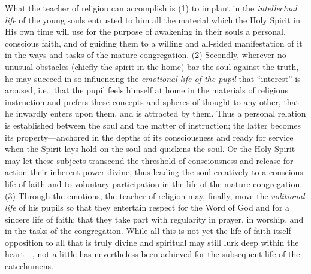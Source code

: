 What the teacher of religion can accomplish is (1) to implant in the \emph{intellectual life} of the young souls entrusted to him all the material which the Holy Spirit in His own time will use for the purpose of awakening in their souls a personal, conscious faith, and of guiding them to a willing and all-sided manifestation of it in the ways and tasks of the mature congregation. (2) Secondly, wherever no unusual obstacles (chiefly the spirit in the home) bar the soul against the truth, he may succeed in so influencing the \emph{emotional life of the pupil} that “interest” is aroused, i.e., that the pupil feels himself at home in the materials of religious instruction and prefers these concepts and spheres of thought to any other, that he inwardly enters upon them, and is attracted by them. Thus a personal relation is established between the soul and the matter of instruction; the latter becomes its property—anchored in the depths of its consciousness and ready for service when the Spirit lays hold on the soul and quickens the soul. Or the Holy Spirit may let these subjects transcend the threshold of consciousness
and release for action their inherent power divine, thus leading the soul creatively to a conscious life of faith and to voluntary participation in the life of the mature congregation. (3) Through the emotions, the teacher of religion may, finally, move the \emph{volitional life} of his pupils so that they entertain respect for the Word of God and for a sincere life of faith; that they take part with regularity in prayer, in worship, and in the tasks of the congregation. While all this is not yet the life of faith itself—opposition to all that is truly divine and spiritual may still lurk deep within the heart—, not a little has nevertheless been achieved for the subsequent life of the catechumens.

